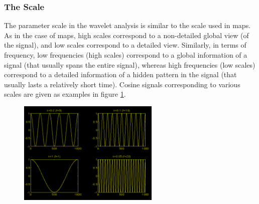 \documentclass[12pt, a4paper, twoside]{report}
\begin{document}
\subsubsection{The Scale}
The parameter scale in the wavelet analysis is similar to the scale used in maps. As in the case of maps, high scales correspond to a non-detailed global view (of the signal), and low scales correspond to a detailed view. Similarly, in terms of frequency, low frequencies (high scales) correspond to a global information of a signal (that usually spans the entire signal), whereas high frequencies (low scales) correspond to a detailed information of a hidden pattern in the signal (that usually lasts a relatively short time). Cosine signals corresponding to various scales are given as examples in figure \ref{fig:cwt-scale}.

\begin{figure}[!h]
	\centering
	\includegraphics[width=0.6\textwidth]
	{images/chapter3/cwt-scale}
	\caption{}
	\label{fig:cwt-scale}
\end{figure}
\end{document}
